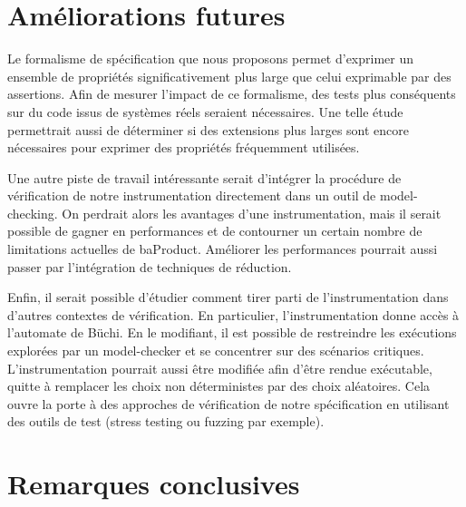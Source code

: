 
\section{Améliorations futures}

Le formalisme de spécification que nous proposons permet d'exprimer un ensemble
de propriétés significativement plus large que celui exprimable par des
assertions. Afin de mesurer l'impact de ce formalisme, des tests plus conséquents
sur du code issus de systèmes réels seraient nécessaires. Une telle étude
permettrait aussi de déterminer si des extensions plus larges sont encore
nécessaires pour exprimer des propriétés fréquemment utilisées.

Une autre piste de travail intéressante serait d'intégrer la procédure de
vérification de notre instrumentation directement dans un outil de
model-checking. On perdrait alors les avantages d'une instrumentation, mais il
serait possible de gagner en performances et de contourner un certain nombre de
limitations actuelles de baProduct. Améliorer les performances pourrait aussi
passer par l'intégration de techniques de réduction.

Enfin, il serait possible d'étudier comment tirer parti de l'instrumentation dans
d'autres contextes de vérification. En particulier, l'instrumentation donne
accès à l'automate de Büchi. En le modifiant, il est possible de restreindre les
exécutions explorées par un model-checker et se concentrer sur des scénarios
critiques. L'instrumentation pourrait aussi être modifiée afin d'être rendue
exécutable, quitte à remplacer les choix non déterministes par des choix
aléatoires. Cela ouvre la porte à des approches de vérification de notre
spécification en utilisant des outils de test (stress testing ou fuzzing par
exemple).

\section{Remarques conclusives}

